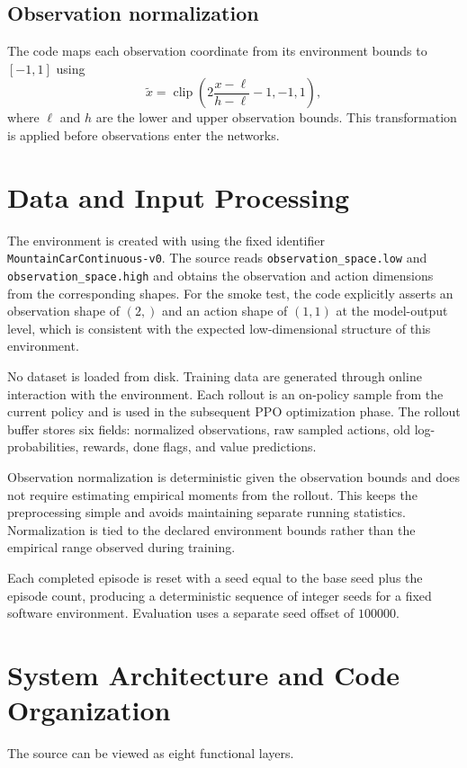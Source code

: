 \documentclass[11pt,a4paper]{article}
\begin{document}
\subsection{Observation normalization}
The code maps each observation coordinate from its environment bounds to $[-1,1]$ using
\begin{equation}
\widetilde{x}
= \operatorname{clip}\left(
2\frac{x-\ell}{h-\ell}-1,
-1,1
\right),
\end{equation}
where $\ell$ and $h$ are the lower and upper observation bounds. This transformation is applied before observations enter the networks.

\section{Data and Input Processing}
The environment is created with  using the fixed identifier \texttt{MountainCarContinuous-v0}. The source reads \texttt{observation\_space.low} and \texttt{observation\_space.high} and obtains the observation and action dimensions from the corresponding shapes. For the smoke test, the code explicitly asserts an observation shape of $(2,)$ and an action shape of $(1,1)$ at the model-output level, which is consistent with the expected low-dimensional structure of this environment.

No dataset is loaded from disk. Training data are generated through online interaction with the environment. Each rollout is an on-policy sample from the current policy and is used in the subsequent PPO optimization phase. The rollout buffer stores six fields: normalized observations, raw sampled actions, old log-probabilities, rewards, done flags, and value predictions.

Observation normalization is deterministic given the observation bounds and does not require estimating empirical moments from the rollout. This keeps the preprocessing simple and avoids maintaining separate running statistics. Normalization is tied to the declared environment bounds rather than the empirical range observed during training.

Each completed episode is reset with a seed equal to the base seed plus the episode count, producing a deterministic sequence of integer seeds for a fixed software environment. Evaluation uses a separate seed offset of $100000$.

\section{System Architecture and Code Organization}
The source can be viewed as eight functional layers.
\end{document}
